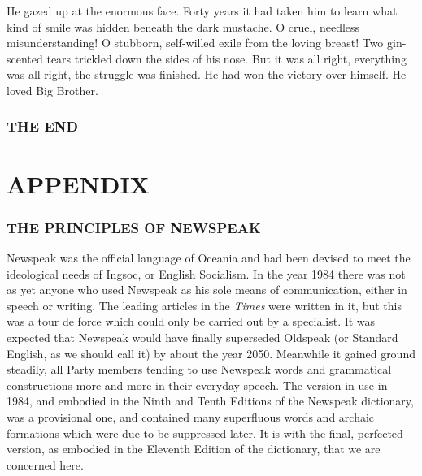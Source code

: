 He gazed up at the enormous face. Forty years it had taken him to learn
what kind of smile was hidden beneath the dark mustache. O cruel,
needless misunderstanding! O stubborn, self-willed exile from the loving
breast! Two gin-scented tears trickled down the sides of his nose. But
it was all right, everything was all right, the struggle was finished.
He had won the victory over himself. He loved Big Brother.

\section{THE END}\label{the-end}


\clearpage
\part{APPENDIX}\label{appendix}

\section{THE PRINCIPLES OF NEWSPEAK}\label{the-principles-of-newspeak}

Newspeak was the official language of Oceania and had been devised to
meet the ideological needs of Ingsoc, or English Socialism. In the year
1984 there was not as yet anyone who used Newspeak as his sole means of
communication, either in speech or writing. The leading articles in the
\emph{Times} were written in it, but this was a tour de force which
could only be carried out by a specialist. It was expected that Newspeak
would have finally superseded Oldspeak (or Standard English, as we
should call it) by about the year 2050. Meanwhile it gained ground
steadily, all Party members tending to use Newspeak words and
grammatical constructions more and more in their everyday speech. The
version in use in 1984, and embodied in the Ninth and Tenth Editions of
the Newspeak dictionary, was a provisional one, and contained many
superfluous words and archaic formations which were due to be suppressed
later. It is with the final, perfected version, as embodied in the
Eleventh Edition of the dictionary, that we are concerned here.

